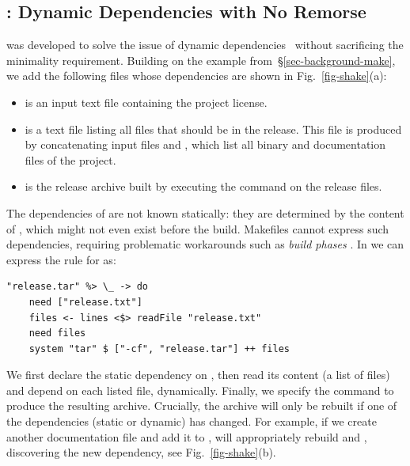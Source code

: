\subsection{\Shake: Dynamic Dependencies with No Remorse}
\label{sec-background-shake}

\Shake was developed to solve the issue of dynamic
dependencies~\cite{mitchell2012shake} without sacrificing
the minimality requirement. Building on the \Make example
from~\S\ref{sec-background-make}, we add the following files whose
dependencies are shown in Fig.~\ref{fig-shake}(a):

\begin{itemize}
    \item {} is an input text file containing the project license.
    \item {} is a text file listing all files that should be in the release. This file
    is produced by concatenating input files  and ,
    which list all binary and documentation files of the project.
    \item {} is the release archive built by executing the
    command  on the release files.
\end{itemize}

The dependencies of  are not known statically: they are
determined by the content of , which might not even exist
before the build. Makefiles cannot express such dependencies, requiring problematic
workarounds such as \emph{build phases} \cite{hadrian}.
In \Shake we can express the rule for  as:

\begin{verbatim}
"release.tar" %> \_ -> do
    need ["release.txt"]
    files <- lines <$> readFile "release.txt"
    need files
    system "tar" $ ["-cf", "release.tar"] ++ files
\end{verbatim}

\noindent
We first declare the static dependency on , then read its
content (a list of files) and depend on each listed file, dynamically. Finally, we specify the
command to produce the resulting archive. Crucially, the archive will only be
rebuilt if one of the dependencies (static or dynamic) has changed. For example,
if we create another documentation file  and add it to
, \Shake will appropriately rebuild  and
, discovering the new dependency, see Fig.~\ref{fig-shake}(b).

